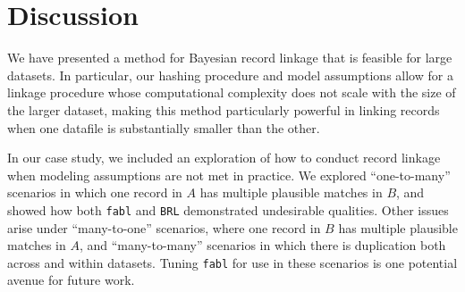\documentclass[12pt,letterpaper]{article}
\newcommand{\1}[1]{\mathbb{I}\!\left[#1\right]} %
\begin{document}

\section{Discussion}
\label{discussion}

We have presented a method for Bayesian record linkage that is feasible
for large datasets. In particular, our hashing procedure and model
assumptions allow for a linkage procedure whose computational complexity
does not scale with the size of the larger dataset, making this method
particularly powerful in linking records when one datafile is
substantially smaller than the other.

In our case study, we included an exploration of how to conduct record
linkage when modeling assumptions are not met in practice. We explored
``one-to-many'' scenarios in which one record in \(A\) has multiple
plausible matches in \(B\), and showed how both \texttt{fabl} and
\texttt{BRL} demonstrated undesirable qualities. Other issues arise
under ``many-to-one'' scenarios, where one record in \(B\) has multiple
plausible matches in \(A\), and ``many-to-many'' scenarios in which
there is duplication both across and within datasets. Tuning
\texttt{fabl} for use in these scenarios is one potential avenue for
future work.
\end{document}
